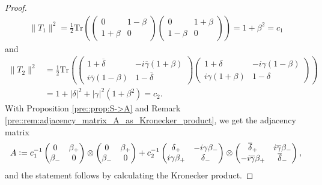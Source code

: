 \documentclass{amsart}
\newcommand{\Tr}{\mathrm{Tr}}
\begin{document}
\begin{proof}
    \begin{align*}
        \|T_1\|^2=
        \frac{1}{2}\Tr\left(
        \begin{pmatrix}
            0&1-\beta\\
            1+\beta&0
        \end{pmatrix}
        \begin{pmatrix}
            0&1+\beta\\
            1-\beta&0
        \end{pmatrix}
        \right)
        =1+\beta^2
        = c_1
    \end{align*}
    and
    \begin{align*}
        \|T_2\|^2
        &=
        \frac{1}{2}\Tr\left(
        \begin{pmatrix}
            1+\overline{\delta}&-i\overline{\gamma}(1+\beta)\\
            i\overline{\gamma}(1-\beta)&1-\overline{\delta}
        \end{pmatrix}
        \begin{pmatrix}
            1+\delta&-i\gamma(1-\beta)\\
            i\gamma(1+\beta)&1-\delta
        \end{pmatrix}
        \right)\\
        &=1+|\delta|^2+|\gamma|^2(1+\beta^2)
         = c_2.
    \end{align*}
    With Proposition \ref{pre::prop:S->A} and Remark \ref{pre::rem:adjacency_matrix_A_as_Kronecker_product}, we get the adjacency matrix
    \begin{align*}
        A \vcentcolon= 
        c_1^{-1}
        \begin{pmatrix}
            0&\beta_+\\
            \beta_-&0
        \end{pmatrix}
        \otimes
        \begin{pmatrix}
            0&\beta_+\\
            \beta_-&0
        \end{pmatrix}
        +c_2^{-1}
        \begin{pmatrix}
            \delta_+&-i\gamma\beta_-\\
            i\gamma\beta_+&\delta_-
        \end{pmatrix}
        \otimes
        \begin{pmatrix}
            \overline{\delta}_+&i\overline{\gamma}\beta_-\\
            -i\overline{\gamma}\beta_+&\overline{\delta}_-
        \end{pmatrix},
    \end{align*}
    and the statement follows by calculating the Kronecker product.


\end{proof}
\end{document}
